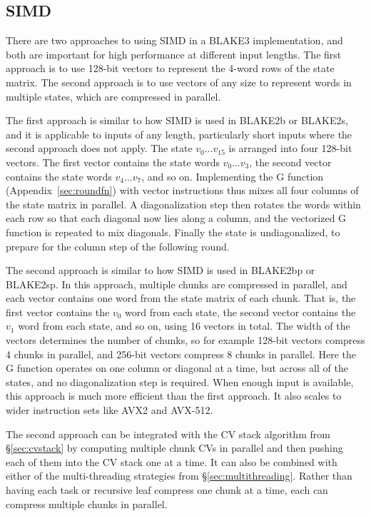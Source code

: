 \documentclass[11pt,notitlepage,a4paper]{article}
\begin{document}
\subsection{SIMD}\label{sec:simd}

There are two approaches to using SIMD in a BLAKE3 implementation, and both are
important for high performance at different input lengths. The first approach
is to use 128-bit vectors to represent the 4-word rows of the state matrix. The
second approach is to use vectors of any size to represent words in multiple
states, which are compressed in parallel.

The first approach is similar to how SIMD is used in BLAKE2b or BLAKE2s, and it
is applicable to inputs of any length, particularly short inputs where the
second approach does not apply. The state $v_0 \ldots v_{15}$ is arranged into
four 128-bit vectors. The first vector contains the state words $v_0 \ldots
v_3$, the second vector contains the state words $v_4 \ldots v_7$, and so on.
Implementing the G function (Appendix~\ref{sec:roundfn}) with vector
instructions thus mixes all four columns of the state matrix in parallel. A
diagonalization step then rotates the words within each row so that each
diagonal now lies along a column, and the vectorized G function is repeated to
mix diagonals. Finally the state is undiagonalized, to prepare for the column
step of the following round.

The second approach is similar to how SIMD is used in BLAKE2bp or BLAKE2sp. In
this approach, multiple chunks are compressed in parallel, and each vector
contains one word from the state matrix of each chunk. That is, the first
vector contains the $v_0$ word from each state, the second vector contains the
$v_1$ word from each state, and so on, using 16 vectors in total. The width of
the vectors determines the number of chunks, so for example 128-bit vectors
compress 4 chunks in parallel, and 256-bit vectors compress 8 chunks in
parallel. Here the G function operates on one column or diagonal at a time, but
across all of the states, and no diagonalization step is required. When enough
input is available, this approach is much more efficient than the first
approach. It also scales to wider instruction sets like AVX2 and AVX-512.

The second approach can be integrated with the CV stack algorithm from
\S\ref{sec:cvstack} by computing multiple chunk CVs in parallel and then
pushing each of them into the CV stack one at a time. It can also be combined
with either of the multi-threading strategies from \S\ref{sec:multithreading}.
Rather than having each task or recursive leaf compress one chunk at a time,
each can compress multiple chunks in parallel.
\end{document}
